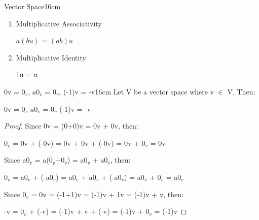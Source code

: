 \begin{definition}{Vector Space}{16cm}
\begin{enumerate}[label=(\alph*), leftmargin=1cm, itemsep=0.1cm]
            \item {\color{lgreen} Multiplicative Associativity}
            
                \hspace{0.5cm}
                $a(bu)$ = $(ab)u$
    
            \item {\color{lgreen} Multiplicative Identity}
            
                \hspace{0.5cm}
                1u = u
        \end{enumerate}
    \end{definition}

    \vspace{0.5cm}



    \begin{wtheorem}{0v = $0_v$, $a0_v$ = $0_v$, (-1)v = -v}{16cm}
        Let V be a vector space where v $\in$ V. Then:

        \hspace{0.5cm}
        0v = $0_v$
        \hspace{1cm}
        $a0_v$ = $0_v$
        \hspace{1cm}
        (-1)v = -v
    \end{wtheorem}

    \begin{proof}
        Since 0v = (0+0)v = 0v + 0v, then:
        
        \hspace{0.5cm}
        $0_v$ = 0v + (-0v) = 0v + 0v + (-0v) = 0v + $0_v$ = 0v
        
        Since a$0_v$
        = a($0_v$+$0_v$)
        = a$0_v$ + a$0_v$, then:

        \hspace{0.5cm}
        $0_v$ = a$0_v$ + (-a$0_v$)
        = a$0_v$ + a$0_v$ + (-a$0_v$)
        = a$0_v$ + $0_v$
        = a$0_v$

        Since $0_v$ = 0v
        = (-1+1)v
        = (-1)v + 1v
        = (-1)v + v, then:
        
        \hspace{0.5cm}
        -v
        = $0_v$ + (-v)
        = (-1)v + v + (-v)
        = (-1)v + $0_v$
        = (-1)v
    \end{proof}

    \vspace{0.5cm}



